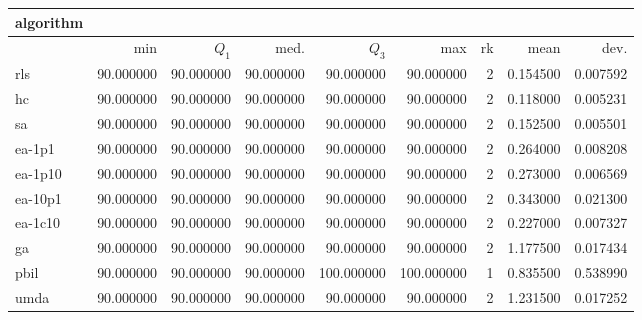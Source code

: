\begin{tabular}{@{}l*{5}{>{{}}N{3}{0}}>{{}}N{2}{0}N{1}{3}N{1}{3}@{}}
\toprule
{algorithm} &  &  \\
\midrule
& {min} & {$Q_1$} & {med.} & {$Q_3$} & {max} & {rk} & {mean} & {dev.} \\
\midrule
rls & {\color{blue}} 90.000000 & {\color{blue}} 90.000000 & {\color{blue}} 90.000000 & 90.000000 & 90.000000 & 2 & 0.154500 & 0.007592 \\
 hc & {\color{blue}} 90.000000 & {\color{blue}} 90.000000 & {\color{blue}} 90.000000 & 90.000000 & 90.000000 & 2 & 0.118000 & 0.005231 \\
 sa & {\color{blue}} 90.000000 & {\color{blue}} 90.000000 & {\color{blue}} 90.000000 & 90.000000 & 90.000000 & 2 & 0.152500 & 0.005501 \\
 ea-1p1 & {\color{blue}} 90.000000 & {\color{blue}} 90.000000 & {\color{blue}} 90.000000 & 90.000000 & 90.000000 & 2 & 0.264000 & 0.008208 \\
 ea-1p10 & {\color{blue}} 90.000000 & {\color{blue}} 90.000000 & {\color{blue}} 90.000000 & 90.000000 & 90.000000 & 2 & 0.273000 & 0.006569 \\
 ea-10p1 & {\color{blue}} 90.000000 & {\color{blue}} 90.000000 & {\color{blue}} 90.000000 & 90.000000 & 90.000000 & 2 & 0.343000 & 0.021300 \\
 ea-1c10 & {\color{blue}} 90.000000 & {\color{blue}} 90.000000 & {\color{blue}} 90.000000 & 90.000000 & 90.000000 & 2 & 0.227000 & 0.007327 \\
 ga & {\color{blue}} 90.000000 & {\color{blue}} 90.000000 & {\color{blue}} 90.000000 & 90.000000 & 90.000000 & 2 & 1.177500 & 0.017434 \\
 pbil & {\color{blue}} 90.000000 & {\color{blue}} 90.000000 & {\color{blue}} 90.000000 & {\color{blue}} 100.000000 & {\color{blue}} 100.000000 & 1 & 0.835500 & 0.538990 \\
 umda & {\color{blue}} 90.000000 & {\color{blue}} 90.000000 & {\color{blue}} 90.000000 & 90.000000 & 90.000000 & 2 & 1.231500 & 0.017252 \\
 \bottomrule
\end{tabular}
